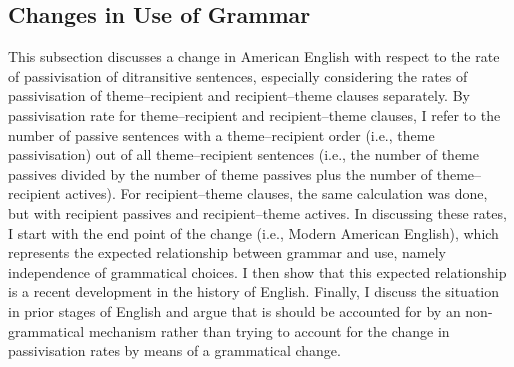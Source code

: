 	\subsection{Changes in Use of Grammar}

	This subsection discusses a change in American English with respect to the rate of passivisation of ditransitive sentences, especially considering the rates of passivisation of theme--recipient and recipient--theme clauses separately. By passivisation rate for theme--recipient and recipient--theme clauses, I refer to the number of passive sentences with a theme--recipient order (i.e., theme passivisation) out of all theme--recipient sentences (i.e., the number of theme passives divided by the number of theme passives plus the number of theme--recipient actives). For recipient--theme clauses, the same calculation was done, but with recipient passives and recipient--theme actives. In discussing these rates, I start with the end point of the change (i.e., Modern American English), which represents the expected relationship between grammar and use, namely independence of grammatical choices. I then show that this expected relationship is a recent development in the history of English. Finally, I discuss the situation in prior stages of English and argue that is should be accounted for by an non-grammatical mechanism rather than trying to account for the change in passivisation rates by means of a grammatical change.

